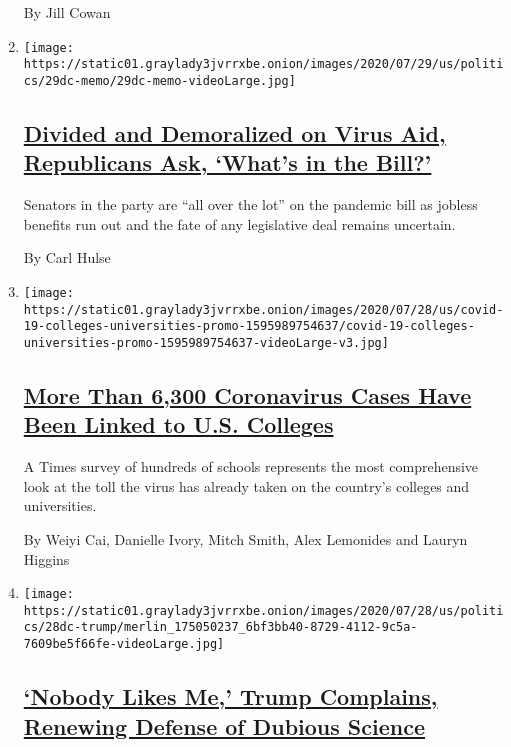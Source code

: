 \begin{enumerate}
  By Jill Cowan
\item
  \texttt{[image: https://static01.graylady3jvrrxbe.onion/images/2020/07/29/us/politics/29dc-memo/29dc-memo-videoLarge.jpg]}

  \hypertarget{divided-and-demoralized-on-virus-aid-republicans-ask-whats-in-the-bill}{%
  \subsection{\texorpdfstring{\href{/2020/07/29/us/politics/republicans-congress-virus-aid.html}{Divided
  and Demoralized on Virus Aid, Republicans Ask, `What's in the
  Bill?'}}{Divided and Demoralized on Virus Aid, Republicans Ask, `What's in the Bill?'}}\label{divided-and-demoralized-on-virus-aid-republicans-ask-whats-in-the-bill}}

  Senators in the party are ``all over the lot'' on the pandemic bill as
  jobless benefits run out and the fate of any legislative deal remains
  uncertain.

  By Carl Hulse
\item
  \texttt{[image: https://static01.graylady3jvrrxbe.onion/images/2020/07/28/us/covid-19-colleges-universities-promo-1595989754637/covid-19-colleges-universities-promo-1595989754637-videoLarge-v3.jpg]}

  \hypertarget{more-than-6300-coronavirus-cases-have-been-linked-to-us-colleges}{%
  \subsection{\texorpdfstring{\href{/interactive/2020/07/28/us/covid-19-colleges-universities.html}{More
  Than 6,300 Coronavirus Cases Have Been Linked to U.S.
  Colleges}}{More Than 6,300 Coronavirus Cases Have Been Linked to U.S. Colleges}}\label{more-than-6300-coronavirus-cases-have-been-linked-to-us-colleges}}

  A Times survey of hundreds of schools represents the most
  comprehensive look at the toll the virus has already taken on the
  country's colleges and universities.

  By Weiyi Cai, Danielle Ivory, Mitch Smith, Alex Lemonides and Lauryn
  Higgins
\item
  \texttt{[image: https://static01.graylady3jvrrxbe.onion/images/2020/07/28/us/politics/28dc-trump/merlin\_175050237\_6bf3bb40-8729-4112-9c5a-7609be5f66fe-videoLarge.jpg]}

  \hypertarget{nobody-likes-me-trump-complains-renewing-defense-of-dubious-science}{%
  \subsection{\texorpdfstring{\href{/2020/07/28/us/politics/trump-nobody-likes-me-walks-out-briefing.html}{`Nobody
  Likes Me,' Trump Complains, Renewing Defense of Dubious
  Science}}{`Nobody Likes Me,' Trump Complains, Renewing Defense of Dubious Science}}\label{nobody-likes-me-trump-complains-renewing-defense-of-dubious-science}}


\end{enumerate}
